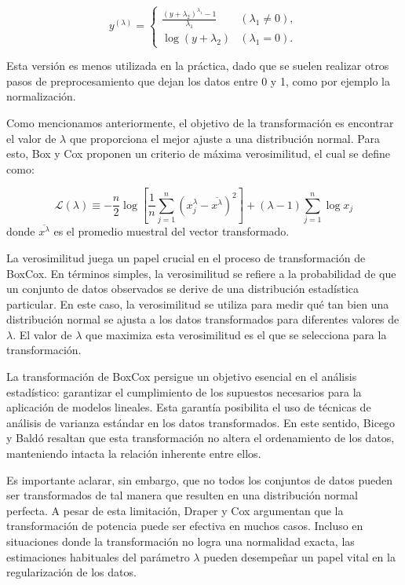     $$
    y^{(\lambda)}= \begin{cases}\frac{\left(y+\lambda_{2}\right)^{\lambda_{1}}-1}{\lambda_{1}} & \left(\lambda_{1} \neq 0\right), \\ \log \left(y+\lambda_{2}\right) & \left(\lambda_{1}=0\right) .\end{cases}
    $$

    Esta versi\'on es menos utilizada en la pr\'actica, dado que se suelen realizar otros pasos de preprocesamiento que dejan los datos entre 0 y 1, como por ejemplo la normalizaci\'on. 

    Como mencionamos anteriormente, el objetivo de la transformaci\'on es encontrar el valor de $\lambda$ que proporciona el mejor ajuste a una distribuci\'on normal. Para esto, Box y Cox proponen un criterio de m\'axima verosimilitud, el cual se define como:

    \begin{equation}
        \mathcal{L}(\lambda) \equiv-\frac{n}{2} \log \left[\frac{1}{n} \sum_{j=1}^{n}\left(x_{j}^{\lambda}-\overline{x^{\lambda}}\right)^{2}\right] +(\lambda-1) \sum_{j=1}^{n} \log x_{j}
    \end{equation}
    donde $\overline{x^{\lambda}}$ es el promedio muestral del vector transformado.

    La verosimilitud juega un papel crucial en el proceso de transformaci\'on de BoxCox. En t\'erminos simples, la verosimilitud se refiere a la probabilidad de que un conjunto de datos observados se derive de una distribuci\'on estad\'istica particular. En este caso, la verosimilitud se utiliza para medir qu\'e tan bien una distribuci\'on normal se ajusta a los datos transformados para diferentes valores de $\lambda$. El valor de $\lambda$ que maximiza esta verosimilitud es el que se selecciona para la transformaci\'on.

    
    La transformaci\'on de BoxCox persigue un objetivo esencial en el an\'alisis estad\'istico: garantizar el cumplimiento de los supuestos necesarios para la aplicaci\'on de modelos lineales. Esta garant\'ia posibilita el uso de t\'ecnicas de an\'alisis de varianza est\'andar en los datos transformados. En este sentido, Bicego y Bald\'o \cite{bicego2016} resaltan que esta transformaci\'on no altera el ordenamiento de los datos, manteniendo intacta la relaci\'on inherente entre ellos.

    Es importante aclarar, sin embargo, que no todos los conjuntos de datos pueden ser transformados de tal manera que resulten en una distribuci\'on normal perfecta. A pesar de esta limitaci\'on, Draper y Cox \cite{draper1969}argumentan que la transformaci\'on de potencia puede ser efectiva en muchos casos. Incluso en situaciones donde la transformaci\'on no logra una normalidad exacta, las estimaciones habituales del par\'ametro $\lambda$ pueden desempe\~nar un papel vital en la regularizaci\'on de los datos.

